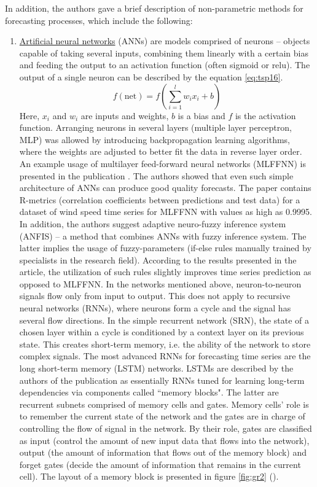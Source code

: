 \documentclass[3p,times,procedia]{elsarticle}
\begin{document}
In addition, the authors gave a brief description of non-parametric methods for forecasting processes, which include the following:
\begin{enumerate}
	\item \underline{Artificial neural networks} (ANNs) are models comprised of neurons -- objects capable of taking several inputs, combining them linearly with a certain bias and feeding the output to an activation function (often sigmoid or relu). The output of a single neuron can be described by the equation \ref{eq:tsp16}.
\begin{equation} \label{eq:tsp16}
f(\mathrm{net}) = f\left( \sum_{i=1}^l w_i x_i + b \right)
\end{equation}
Here, $x_i$ and $w_i$ are inputs and weights, $b$ is a bias and $f$ is the activation function. Arranging neurons in several layers (multiple layer perceptron, MLP) was allowed by introducing backpropagation learning algorithms, where the weights are adjusted to better fit the data in reverse layer order.
An example usage of multilayer feed-forward neural networks (MLFFNN) is presented in the publication \cite{khosravi2018time}. The authors showed that even such simple architecture of ANNs can produce good quality forecasts. The paper contains R-metrics (correlation coefficients between predictions and test data) for a dataset of wind speed time series for MLFFNN with values as high as 0.9995.
In addition, the authors suggest adaptive neuro-fuzzy inference system (ANFIS) -- a method that combines ANNs with fuzzy inference system. The latter implies the usage of fuzzy-parameters (if-else rules manually trained by specialists in the research field). According to the results presented in the article, the utilization of such rules slightly improves time series prediction as opposed to MLFFNN.
In the networks mentioned above, neuron-to-neuron signals flow only from input to output. This does not apply to recursive neural networks (RNNs), where neurons form a cycle and the signal has several flow directions. In the simple recurrent network (SRN), the state of a chosen layer within a cycle is conditioned by a context layer on its previous state. This creates short-term memory, i.e. the ability of the network to store complex signals.
The most advanced RNNs for forecasting time series are the long short-term memory (LSTM) networks. LSTMs are described by the authors of the publication \cite{hua2019deep} as essentially RNNs tuned for learning long-term dependencies via components called ``memory blocks". The latter are recurrent subnets comprised of memory cells and gates. Memory cells' role is to remember the current state of the network and the gates are in charge of controlling the flow of signal in the network. By their role, gates are classified as input (control the amount of new input data that flows into the network), output (the amount of information that flows out of the memory block) and forget gates (decide the amount of information that remains in the current cell). The layout of a memory block is presented in figure \ref{fig:gr2} (\cite{hua2019deep}).

\end{enumerate}
\end{document}
